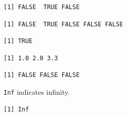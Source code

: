 \begin{verbatim}
[1] FALSE  TRUE FALSE
\end{verbatim}

\begin{Shaded}
\begin{Highlighting}[]
\end{Highlighting}
\end{Shaded}

\begin{verbatim}
[1] FALSE  TRUE FALSE FALSE FALSE
\end{verbatim}

\begin{Shaded}
\begin{Highlighting}[]
\end{Highlighting}
\end{Shaded}

\begin{verbatim}
[1] TRUE
\end{verbatim}

\begin{Shaded}
\begin{Highlighting}[]
\end{Highlighting}
\end{Shaded}

\begin{verbatim}
[1] 1.0 2.0 3.3
\end{verbatim}

\begin{Shaded}
\begin{Highlighting}[]
\end{Highlighting}
\end{Shaded}

\begin{verbatim}
[1] FALSE FALSE FALSE
\end{verbatim}

\texttt{Inf} indicates infinity.

\begin{Shaded}
\begin{Highlighting}[]
\OperatorTok{/}
\end{Highlighting}
\end{Shaded}

\begin{verbatim}
[1] Inf
\end{verbatim}

